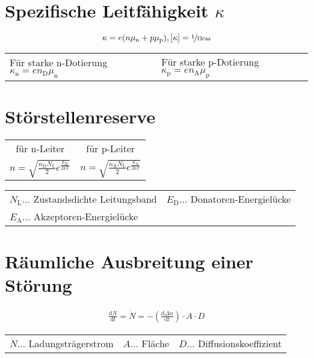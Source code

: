 	\section{Spezifische Leitfähigkeit $\kappa$}
		\[
			\kappa=e(n\mu_{\text{n}}+p\mu_{\text{p}}), [\kappa]=\nicefrac{1}{\Omega\text{cm}}
		\]

		\begin{table}[h]
		\begin{tabular}{ll}
		Für starke n-Dotierung $\kappa_{\text{n}}=en_{\text{D}}\mu_{\text{n}}$ & Für starke p-Dotierung $\kappa_{\text{p}}=en_{\text{A}}\mu_{\text{p}}$\\
		\end{tabular}
		\end{table}
	
	\section{Störstellenreserve}
		\begin{tabularx}{\textwidth}{c c}
		für n-Leiter & für p-Leiter\\
		$n=\sqrt{\frac{n_{\text{D}}N_{\text{L}}}{2}e^{\frac{E_{\text{D}}}{2kT}}}$
		& $n=\sqrt{\frac{n_{\text{A}}N_{\text{L}}}{2}e^{\frac{E_{\text{A}}}{2kT}}}$ \\
		\end{tabularx}

		\begin{table}[h]
		\begin{tabular}{ll}
		$N_{\text{L}}\dots$ Zustandsdichte Leitungsband & $E_{\text{D}}\dots$ Donatoren-Energielücke\\
		$E_{\text{A}}\dots$ Akzeptoren-Energielücke\\
		\end{tabular}
		\end{table}
	
	\section{Räumliche Ausbreitung einer Störung}
		\begin{align*}
			\frac{\mathrm{d}N}{\mathrm{d}t}=\dot{N}=-\left(\frac{\mathrm{d}\Delta n}{\mathrm{d}t}\right)\cdot A\cdot D
		\end{align*}

		\begin{table}[h]
		\begin{tabular}{lll}
		$\dot{N}\dots$ Ladungsträgerstrom & $A\dots$ Fläche & $D\dots$ Diffusionskoeffizient\\
		\end{tabular}
		\end{table}
	
